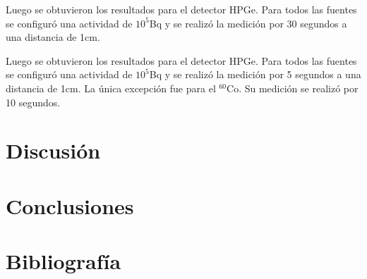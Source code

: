 \documentclass[onecolumn]{article}
\begin{document}
		Luego se obtuvieron los resultados para el detector HPGe. Para todos las fuentes se configuró una actividad de $10^5$Bq y se realizó la medición por 30 segundos a una distancia de 1cm.

		Luego se obtuvieron los resultados para el detector HPGe. Para todos las fuentes se configuró una actividad de $10^5$Bq y se realizó la medición por 5 segundos a una distancia de 1cm. La única excepción fue para el ${}^{60}\mathrm{Co}$. Su medición se realizó por 10 segundos.

	\section{Discusión}
	\section{Conclusiones}
	\section{Bibliografía}
\end{document}
